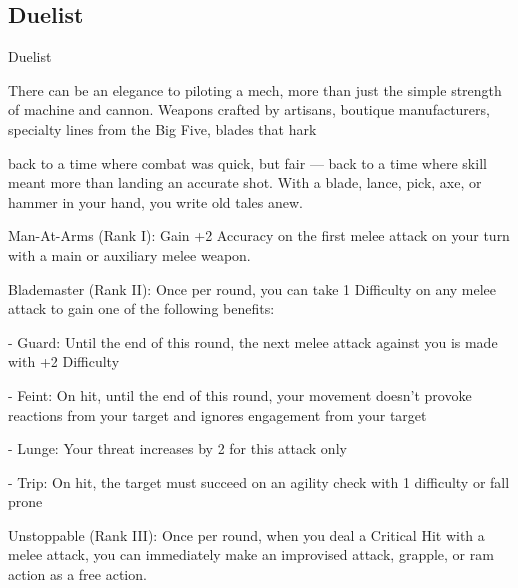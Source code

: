 \subsection{Duelist}

                                                     Duelist

There can be an elegance to piloting a mech, more than just the simple strength of machine and cannon.
Weapons crafted by artisans, boutique manufacturers, specialty lines from the Big Five, blades that hark

back to a time where combat was quick, but fair — back to a time where skill meant more than landing an
accurate shot. With a blade, lance, pick, axe, or hammer in your hand, you write old tales anew.

Man-At-Arms (Rank I): Gain +2 Accuracy on the first melee attack on your turn with a main or
auxiliary melee weapon.

Blademaster (Rank II): Once per round, you can take 1 Difficulty on any melee attack to gain
one of the following benefits:

     -   Guard: Until the end of this round, the next melee attack against you is made with +2
         Difficulty

     -   Feint: On hit, until the end of this round, your movement doesn't provoke reactions from
         your target and ignores engagement from your target

     -   Lunge: Your threat increases by 2 for this attack only

     -   Trip: On hit, the target must succeed on an agility check with 1 difficulty or fall prone

Unstoppable (Rank III): Once per round, when you deal a Critical Hit with a melee attack, you
can immediately make an improvised attack, grapple, or ram action as a free action.
